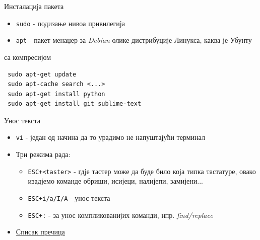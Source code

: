 \documentclass{beamer}
\begin{document}
\begin{frame}[fragile]{Инсталација пакета}

\begin{itemize}
    \item \texttt{sudo} - подизање нивоа привилегија
    \item \texttt{apt} - пакет менаџер за \textit{Debian}-олике дистрибуције Линукса, каква је Убунту
\end{itemize}

\begin{block}{са компресијом}
 \begin{lstlisting}
 sudo apt-get update
 sudo apt-cache search <...>
 sudo apt-get install python
 sudo apt-get install git sublime-text
 \end{lstlisting}
\end{block}
    
\end{frame}

\begin{frame}{Унос текста}
\begin{itemize}
    \item \texttt{vi} - један од начина да то урадимо не напуштајући терминал
    \item Три режима рада:
    \begin{itemize}
        \item \texttt{ESC+<taster>} - гдје тастер може да буде било која типка тастатуре, овако изадјемо команде обриши, исијеци, налијепи, замијени...
        \item \texttt{ESC+i/a/I/A} - унос текста
        \item \texttt{ESC+:} - за унос компликованијих команди, нпр. \textit{find/replace}
    \end{itemize}
    \item \textcolor{orange}{\href{https://www.gosquared.com/resources/vi-cheat-sheet/}{Списак пречица}}
\end{itemize}
\end{frame}
\end{document}

